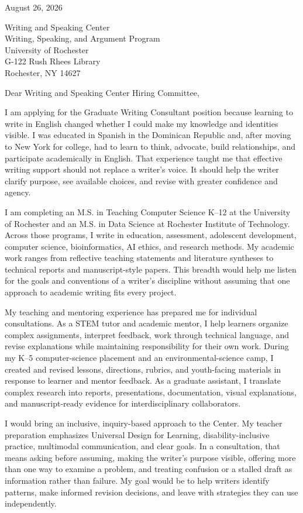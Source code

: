 \documentclass[11pt,letterpaper]{article}
\begin{document}
\begin{flushright}
August 26, 2026
\end{flushright}

Writing and Speaking Center\\
Writing, Speaking, and Argument Program\\
University of Rochester\\
G-122 Rush Rhees Library\\
Rochester, NY 14627

Dear Writing and Speaking Center Hiring Committee,

I am applying for the Graduate Writing Consultant position because learning to write in English changed whether I could make my knowledge and identities visible. I was educated in Spanish in the Dominican Republic and, after moving to New York for college, had to learn to think, advocate, build relationships, and participate academically in English. That experience taught me that effective writing support should not replace a writer's voice. It should help the writer clarify purpose, see available choices, and revise with greater confidence and agency.

I am completing an M.S. in Teaching Computer Science K--12 at the University of Rochester and an M.S. in Data Science at Rochester Institute of Technology. Across those programs, I write in education, assessment, adolescent development, computer science, bioinformatics, AI ethics, and research methods. My academic work ranges from reflective teaching statements and literature syntheses to technical reports and manuscript-style papers. This breadth would help me listen for the goals and conventions of a writer's discipline without assuming that one approach to academic writing fits every project.

My teaching and mentoring experience has prepared me for individual consultations. As a STEM tutor and academic mentor, I help learners organize complex assignments, interpret feedback, work through technical language, and revise explanations while maintaining responsibility for their own work. During my K--5 computer-science placement and an environmental-science camp, I created and revised lessons, directions, rubrics, and youth-facing materials in response to learner and mentor feedback. As a graduate assistant, I translate complex research into reports, presentations, documentation, visual explanations, and manuscript-ready evidence for interdisciplinary collaborators.

I would bring an inclusive, inquiry-based approach to the Center. My teacher preparation emphasizes Universal Design for Learning, disability-inclusive practice, multimodal communication, and clear goals. In a consultation, that means asking before assuming, making the writer's purpose visible, offering more than one way to examine a problem, and treating confusion or a stalled draft as information rather than failure. My goal would be to help writers identify patterns, make informed revision decisions, and leave with strategies they can use independently.
\end{document}
